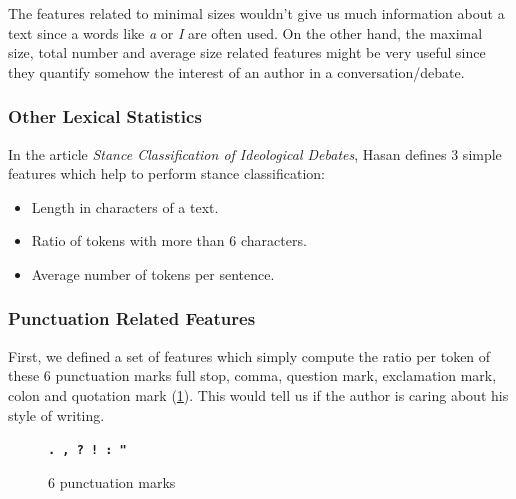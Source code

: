 The features related to minimal sizes wouldn't give us much information about a text since a words like \emph{a} or \emph{I} are often used. On the other hand, the maximal size, total number and average size related features might be very useful since they quantify somehow the interest of an author in a conversation/debate.

\subsubsection{Other Lexical Statistics}
In the article \emph{Stance Classification of Ideological Debates}\cite{Hasan-Ng:IJCNLP:2013}, Hasan defines 3 simple features which help to perform stance classification:
\
\begin{itemize}
  \item Length in characters of a text.
  \item Ratio of tokens with more than 6 characters.
  \item Average number of tokens per sentence.
\end{itemize}  

\subsubsection{Punctuation Related Features}
First, we defined a set of features which simply compute the ratio per token of these 6 punctuation marks full stop, comma, question mark, exclamation mark, colon and quotation mark (\cref{punctuation}). This would tell us if the author is caring about his style of writing.
\\
\begin{figure}[h]
\begin{center}
\texttt{\textbf{.  ,  ?  !  :  "}}
\caption{\label{punctuation} 6 punctuation marks}
\end{center}
\end{figure}

